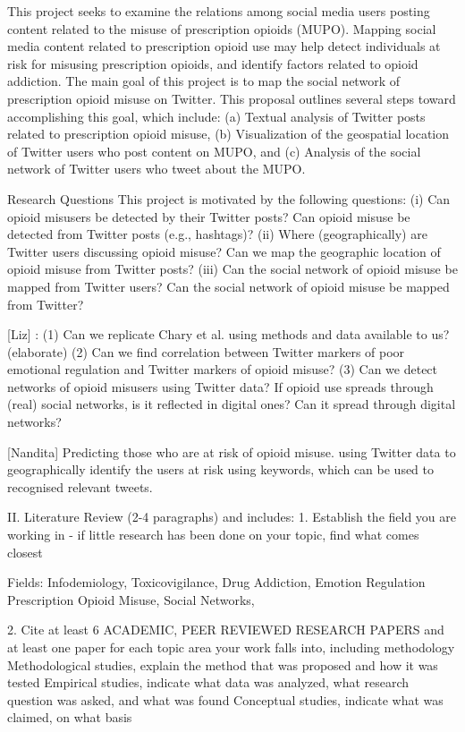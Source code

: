 \documentclass[sigconf]{acmart}
\begin{document}
This project seeks to examine the relations among social media users posting content related to the misuse of prescription opioids (MUPO). Mapping social media content related to prescription opioid use may help detect individuals at risk for misusing prescription opioids, and identify factors related to opioid addiction. The main goal of this project is to map the social network of prescription opioid misuse on Twitter. This proposal outlines several steps toward accomplishing this goal, which include: (a) Textual analysis of Twitter posts related to prescription opioid misuse, (b) Visualization of the geospatial location of Twitter users who post content on MUPO, and (c) Analysis of the social network of Twitter users who tweet about the MUPO. 

Research Questions 
This project is motivated by the following questions: 
(i) Can opioid misusers be detected by their Twitter posts? 
Can opioid misuse be detected from Twitter posts (e.g., hashtags)? 
(ii) Where (geographically) are Twitter users discussing opioid misuse? 
Can we map the geographic location of opioid misuse from Twitter posts? 
(iii) Can the social network of opioid misuse be mapped from Twitter users? 
Can the social network of opioid misuse be mapped from Twitter? 

[Liz] : (1) Can we replicate Chary et al. using methods and data available to us? (elaborate) 
(2) Can we find correlation between Twitter markers of poor emotional regulation and Twitter markers of opioid misuse? (3) Can we detect networks of opioid misusers using Twitter data?
If opioid use spreads through (real) social networks, is it reflected in digital ones? Can it spread through digital networks? 

[Nandita] Predicting those who are at risk of opioid misuse. using Twitter data to geographically identify the users at risk using keywords, which can be used to recognised relevant tweets.

II. Literature Review (2-4 paragraphs) and includes:
1. Establish the field you are working in - if little research has been done on your topic, find what comes closest

Fields: Infodemiology, Toxicovigilance, 
Drug Addiction, Emotion Regulation
Prescription Opioid Misuse, Social Networks, 

2. Cite at least 6 ACADEMIC, PEER REVIEWED RESEARCH PAPERS and at least one paper for each topic area your work falls into, including methodology
Methodological studies, explain the method that was proposed and how it was tested
Empirical studies, indicate what data was analyzed, what research question was asked, and what was found
Conceptual studies, indicate what was claimed, on what basis
\end{document}
